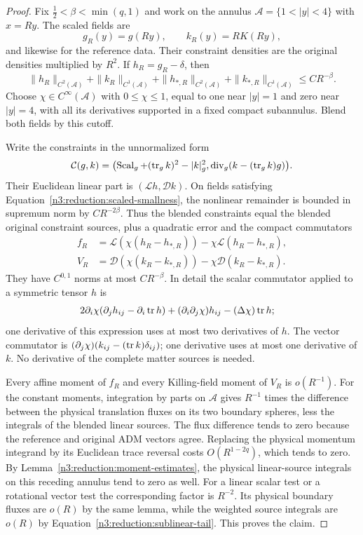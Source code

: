 \begin{proof}
Fix $\tfrac12<\beta<\min(q,1)$ and work on the annulus
$\mathcal A=\{1<|y|<4\}$ with $x=Ry$.  The scaled fields are
\[
 g_R(y)=g(Ry),\qquad k_R(y)=RK(Ry),
\]
and likewise for the reference data.  Their constraint densities are the
original densities multiplied by $R^2$.  If $h_R=g_R-\delta$, then
\begin{equation}
 \label{n3:reduction:scaled-smallness}
 \|h_R\|_{C^2(\mathcal A)}+\|k_R\|_{C^1(\mathcal A)}
 +\|h_{*,R}\|_{C^2(\mathcal A)}+\|k_{*,R}\|_{C^1(\mathcal A)}
 \le CR^{-\beta}.
\end{equation}
Choose $\chi\in C^\infty(\mathcal A)$ with $0\le\chi\le1$, equal to one near $|y|=1$ and zero
near $|y|=4$, with all its derivatives supported in a fixed compact
subannulus.  Blend both fields by this cutoff.

Write the constraints in the unnormalized form
\[
 \mathcal C(g,k)
 =\bigl(\operatorname{Scal}_g+(\operatorname{tr}_gk)^2-|k|_g^2,
             \operatorname{div}_g(k-(\operatorname{tr}_gk)g)\bigr).
\]
Their Euclidean linear part is $(\mathcal Lh,\mathcal Dk)$.
On fields satisfying Equation~\eqref{n3:reduction:scaled-smallness}, the
nonlinear remainder is bounded in supremum norm by $CR^{-2\beta}$.
Thus the blended constraints equal the blended original constraint
sources, plus a quadratic error and the compact commutators
\begin{align*}
 f_R&=\mathcal L(\chi(h_R-h_{*,R}))
                      -\chi\mathcal L(h_R-h_{*,R}),\\
 V_R&=\mathcal D(\chi(k_R-k_{*,R}))
                      -\chi\mathcal D(k_R-k_{*,R}).
\end{align*}
They have $C^{0,1}$ norms at most $CR^{-\beta}$.  In detail the scalar
commutator applied to a symmetric tensor $h$ is
\begin{align*}
 &2\partial_i\chi(\partial_jh_{ij}-\partial_i\operatorname{tr} h)
       +(\partial_i\partial_j\chi)h_{ij}-(\Delta\chi)\operatorname{tr} h;
\end{align*}
one derivative of this expression uses at most two derivatives of $h$.
The vector commutator is $(\partial_j\chi)(k_{ij}-(\operatorname{tr} k)\delta_{ij})$;
one derivative uses at most one derivative of $k$.  No derivative of the
complete matter sources is needed.

Every affine moment of $f_R$ and every Killing-field moment of $V_R$
is $o(R^{-1})$.  For the constant moments, integration by parts on
$\mathcal A$ gives $R^{-1}$ times the difference between the physical
translation fluxes on its two boundary spheres, less the integrals of
the blended linear sources.  The flux difference tends to zero because
the reference and original ADM vectors agree.  Replacing the physical
momentum integrand by its Euclidean trace reversal costs
$O(R^{1-2q})$, which tends to zero.  By
Lemma~\ref{n3:reduction:moment-estimates}, the physical linear-source
integrals on this receding annulus tend to zero as well.
For a linear scalar test or a rotational vector test the corresponding
factor is $R^{-2}$.  Its physical boundary fluxes are $o(R)$ by the same
lemma, while the weighted source integrals are $o(R)$ by
Equation~\eqref{n3:reduction:sublinear-tail}.  This proves the claim.


\end{proof}
